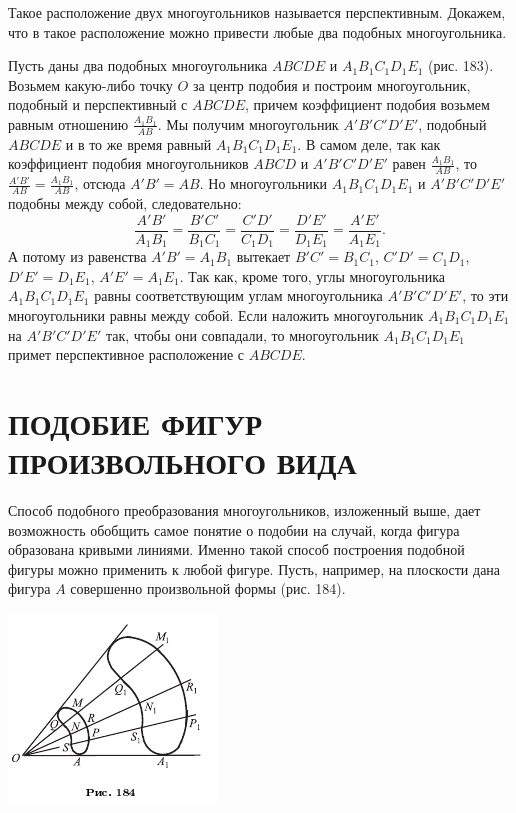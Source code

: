 \documentclass[oneside]{book}
\begin{document}
Такое расположение двух многоугольников называется перспективным.
Докажем, что в такое расположение можно привести любые два подобных многоугольника.

Пусть даны два подобных многоугольника $ABCDE$ и $A_1B_1C_1D_1E_1$ (рис. 183).
Возьмем какую-либо точку $O$ за центр подобия и построим многоугольник, подобный и перспективный с $ABCDE$, причем коэффициент подобия возьмем равным отношению $\frac{A_1B_1}{AB}$.
Мы получим многоугольник $A'B'C'D'E'$, подобный $ABCDE$ и в то же время равный $A_1B_1C_1D_1E_1$.
В самом деле, так как коэффициент подобия многоугольников $ABCD$ и $A'B'C'D'E'$ равен $\frac{A_1B_1}{AB}$, то $\frac{A'B'}{AB}=\frac{A_1B_1}{AB}$, отсюда $A'B'=AB$.
Но многоугольники $A_1B_1C_1D_1E_1$ и $A'B'C'D'E'$ подобны между собой, следовательно:
\[\frac{A'B'}{A_1B_1}=\frac{B'C'}{B_1C_1}=\frac{C'D'}{C_1D_1}=\frac{D'E'}{D_1E_1}=\frac{A'E'}{A_1E_1}.\]
А потому из равенства $A'B'=A_1B_1$ вытекает $B'C'=B_1C_1$, $C'D'=C_1D_1$, $D'E'=D_1E_1$, $A'E'=A_1E_1$.
Так как, кроме того, углы многоугольника $A_1B_1C_1D_1E_1$ равны соответствующим углам многоугольника $A'B'C'D'E'$, то эти многоугольники равны между собой.
Если наложить многоугольник $A_1B_1C_1D_1E_1$ на  $A'B'C'D'E'$ так, чтобы они совпадали, то многоугольник $A_1B_1C_1D_1E_1$ примет перспективное расположение с $ABCDE$. %

\section{ПОДОБИЕ ФИГУР ПРОИЗВОЛЬНОГО ВИДА}

Способ подобного преобразования многоугольников, изложенный выше, дает возможность обобщить самое понятие о подобии на случай, когда фигура образована кривыми линиями.
Именно такой способ построения подобной фигуры можно применить к любой фигуре.
Пусть, например, на плоскости дана фигура $A$ совершенно произвольной формы (рис. 184).

\includegraphics{pics/ris-184}
\end{document}
